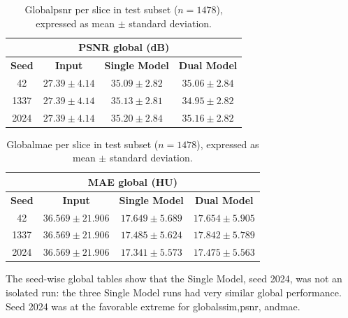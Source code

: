 \begin{table}[htbp]
    \centering
    \begin{tabular}{cccc}
        \multicolumn{4}{c}{\textbf{PSNR global (dB)}} \\[4pt]
        \hline
        \textbf{Seed} & \textbf{Input} & \textbf{Single Model} & \textbf{Dual Model} \\
        \hline
        42   & $27.39 \pm 4.14$ & $35.09 \pm 2.82$ & $35.06 \pm 2.84$ \\
        1337 & $27.39 \pm 4.14$ & $35.13 \pm 2.81$ & $34.95 \pm 2.82$ \\
        2024 & $27.39 \pm 4.14$ & $35.20 \pm 2.84$ & $35.16 \pm 2.82$ \\
        \hline
    \end{tabular}
    \captionsetup{skip=2pt}
    \caption[Per-slice global\acrshort{psnr} on the test set]{Global\acrshort{psnr} per slice in test subset ($n=1478$), expressed as mean $\pm$ standard deviation.}
    \label{tab:global-psnr}
\end{table}

\begin{table}[htbp]
    \centering
    \begin{tabular}{cccc}
        \multicolumn{4}{c}{\textbf{MAE global (HU)}} \\[4pt]
        \hline
        \textbf{Seed} & \textbf{Input} & \textbf{Single Model} & \textbf{Dual Model} \\
        \hline
        42   & $36.569 \pm 21.906$ & $17.649 \pm 5.689$ & $17.654 \pm 5.905$ \\
        1337 & $36.569 \pm 21.906$ & $17.485 \pm 5.624$ & $17.842 \pm 5.789$ \\
        2024 & $36.569 \pm 21.906$ & $17.341 \pm 5.573$ & $17.475 \pm 5.563$ \\
        \hline
    \end{tabular}
    \captionsetup{skip=2pt}
    \caption[Per-slice global MAE on the test set]{Global\acrshort{mae} per slice in test subset ($n=1478$), expressed as mean $\pm$ standard deviation.}
    \label{tab:global-mae}
\end{table}
\FloatBarrier
The seed-wise global tables show that the Single Model, seed 2024, was not an isolated run: the three Single Model runs had very similar global performance. Seed 2024 was at the favorable extreme for global\acrshort{ssim},\acrshort{psnr}, and\acrshort{mae}.

